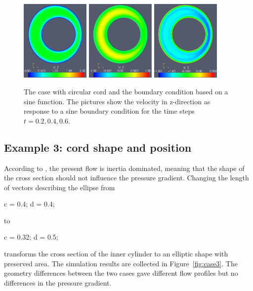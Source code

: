 \begin{figure}
\center
\includegraphics[width=0.3\textwidth]{chapters/hentschel/pdf/sin_sysmax_nmb2.pdf}
\includegraphics[width=0.3\textwidth]{chapters/hentschel/pdf/sin_sysdia_nmb4.pdf}
\includegraphics[width=0.3\textwidth]{chapters/hentschel/pdf/sin_diamin_nmb6.pdf}
\caption{The case with circular cord and the boundary condition based on a
    sine function. The pictures show the velocity in z-direction as
    response to a sine boundary condition for the time steps $t=0.2,
    0.4, 0.6$.}
\label{fig:case2}
\end{figure}

\subsection{Example 3: cord shape and position}

According to \citet{LothYardimciAlperin2001,AlperinMazdaLichtorEtAl2006},
the present flow is inertia dominated, meaning that the shape of the
cross section should not influence the pressure gradient. Changing the
length of vectors describing the ellipse from
\begin{anycode}
c = 0.4;
d = 0.4;
\end{anycode}
to
\begin{anycode}
c = 0.32;
d = 0.5;
\end{anycode}
transforms the cross section of the inner cylinder to an elliptic
shape with preserved area. The simulation results are collected in
Figure~\ref{fig:case3}. The geometry differences between the two cases
gave different flow profiles but no differences in the pressure
gradient.

